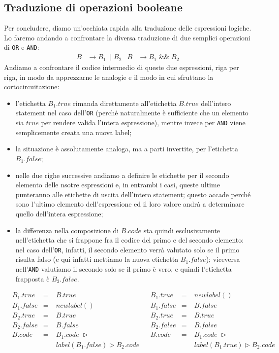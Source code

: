 \documentclass[class=book, crop=false, oneside, 12pt]{standalone}
\begin{document}
\subsection{Traduzione di operazioni booleane}
Per concludere, diamo un'occhiata rapida alla traduzione delle espressioni logiche. Lo faremo andando a confrontare la diversa traduzione di due semplici operazioni di \texttt{OR} e \texttt{AND}:
\begin{align*}
    B &\to B_1\; ||\; B_2 & B &\to B_1\; \&\&\; B_2 
\end{align*}
Andiamo a confrontare il codice intermedio di queste due espressioni, riga per riga, in modo da apprezzarne le analogie e il modo in cui sfruttano la cortocircuitazione:
\begin{itemize}
    \item l'etichetta \(B_1.true\) rimanda direttamente all'etichetta \(B.true\) dell'intero statement nel caso dell'\texttt{OR} (perché naturalmente è sufficiente che un elemento sia \(true\) per rendere valida l'intera espressione), mentre invece per \texttt{AND} viene semplicemente creata una nuova label;
    \item la situazione è assolutamente analoga, ma a parti invertite, per l'etichetta \(B_1.false\);
    \item nelle due righe successive andiamo a definire le etichette per il secondo elemento delle nsotre espressioni e, in entrambi i casi, queste ultime punteranno alle etichette di uscita dell'intero statement; questo accade perché sono l'ultimo elemento dell'espressione ed il loro valore andrà a determinare quello dell'intera espressione;
    \item la differenza nella composizione di \(B.code\) sta quindi esclusivamente nell'etichetta che si frappone fra il codice del primo e del secondo elemento: nel caso dell'\texttt{OR}, infatti, il secondo elemento verrà valutato solo se il primo risulta falso (e qui infatti mettiamo la nuova etichetta \(B_1.false\)); viceversa nell'\texttt{AND} valutiamo il secondo solo se il primo è vero, e quindi l'etichetta frapposta è \(B_2.false\).
\end{itemize}
\begin{align*}
    &B_1.true &=\; &B.true & &B_1.true &=\; &newlabel() \\
    &B_1.false &=\; &newlabel() & &B_1.false &=\; &B.false \\
    &B_2.true &=\; &B.true & &B_2.true &=\; &B.true \\
    &B_2.false &=\; &B.false & &B_2.false &=\; &B.false \\
    &B.code &=\; &B_1.code\; \triangleright & &B.code &=\; &B_1.code\; \triangleright \\
    &&&label(B_1.false) \triangleright  B_2.code & &&&  label(B_1.true) \triangleright B_2.code
\end{align*}
\end{document}
